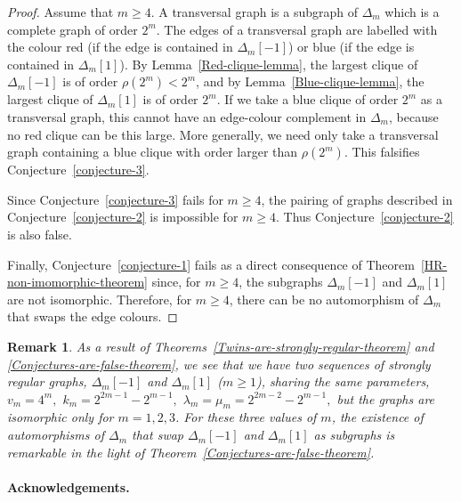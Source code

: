 \documentclass[12pt,a4paper]{article}
\newtheorem*{remark}{Remark}
\begin{document}
\begin{proof}
Assume that $m \geqslant 4$.
A transversal graph is a subgraph of $\varDelta_m$ which is a complete graph of order $2^m$.
The edges of a transversal graph are labelled with the colour red (if the edge is contained in $\varDelta_m[-1]$) or blue
(if the edge is contained in $\varDelta_m[1]$).
By Lemma~\ref{Red-clique-lemma}, the largest clique of $\varDelta_m[-1]$ is of order $\rho(2^m) < 2^m$,
and by Lemma~\ref{Blue-clique-lemma}, the largest clique of $\varDelta_m[1]$ is of order $2^m$.
If we take a blue clique of order $2^m$ as a transversal graph, this cannot have an edge-colour complement
in $\varDelta_m$, because no red clique can be this large.
More generally, we need only take a transversal graph containing a blue clique with order larger than $\rho(2^m)$.
This falsifies Conjecture~\ref{conjecture-3}.

Since Conjecture~\ref{conjecture-3} fails for $m \geqslant 4$, 
the pairing of graphs described in Conjecture~\ref{conjecture-2} is impossible for $m \geqslant 4$.
Thus Conjecture~\ref{conjecture-2} is also false.

Finally, Conjecture~\ref{conjecture-1} fails as a direct consequence of Theorem~\ref{HR-non-imomorphic-theorem}
since, for $m \geqslant 4$, the subgraphs $\varDelta_m[-1]$ and $\varDelta_m[1]$are not isomorphic.
Therefore, for $m \geqslant 4$,  there can be no automorphism of $\varDelta_m$ that swaps the edge colours. 
\end{proof}

\begin{remark}
As a result of Theorems~\ref{Twins-are-strongly-regular-theorem} and \ref{Conjectures-are-false-theorem},
we see that we have two sequences of strongly regular graphs, $\varDelta_m[-1]$ and $\varDelta_m[1]$ ($m \geqslant 1$),
sharing the same parameters, 
$v_m = 4^m,$ $k_m = 2^{2 m - 1} - 2^{m - 1},$ $\lambda_m=\mu_m=2^{2 m - 2} - 2^{m - 1},$
but the graphs are isomorphic only for $m=1, 2, 3$.
For these three values of $m$, the existence of
automorphisms of $\varDelta_m$ that swap $\varDelta_m[-1]$ and $\varDelta_m[1]$ 
as subgraphs \cite[Table 1]{Leo14Constructions}
is remarkable in the light of Theorem~\ref{Conjectures-are-false-theorem}.
\end{remark}

\paragraph*{Acknowledgements.}
\end{document}
